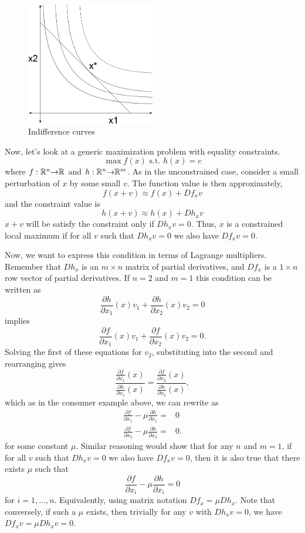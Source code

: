 \begin{figure}\caption{Indifference curves\label{fig:indiff}}
  \begin{center}
    \includegraphics[width=0.5\textwidth]{indiff}
  \end{center}
\end{figure}

Now, let's look at a generic maximization problem with equality
constraints. \[ \max f(x) \text{ s.t. } h(x) = c \]
where $f: \mathbb{R}^n {\rightarrow} \mathbb{R}$ and $h: \mathbb{R}^n {\rightarrow} \mathbb{R}^m$. As in the unconstrained
case, consider a small perturbation of $x$ by some small $v$. The
function value is then approximately,
\[ f(x+v) \approx f(x) + Df_x v \]
and the constraint value is 
\[ h(x+v) \approx h(x) + Dh_x v \] $x+v$ will be satisfy the
constraint only if $Dh_xv = 0$. Thus, $x$ is a constrained local
maximum if for all $v$ such that $Dh_x v = 0$ we also have $Df_x v =
0$. 

Now, we want to express this condition in terms of Lagrange
multipliers. Remember that $Dh_x$ is an $m \times n$ matrix of partial
derivatives, and $Df_x$ is a $1 \times n$ row vector of partial
derivatives.  If $n=2$ and $m=1$ this condition can be written as
\[ \frac{\partial h}{\partial x_1} (x) v_1 + \frac{\partial
  h}{\partial x_2} (x) v_2 = 0 \]
implies
\[ \frac{\partial f}{\partial x_1} (x) v_1 + \frac{\partial
  f}{\partial x_2} (x) v_2 = 0. \]
Solving the first of these equations for $v_2$, substituting into the
second and rearranging gives
\[ \frac{ \frac{\partial f}{\partial x_1}(x) } { \frac{\partial
    h}{\partial x_1}(x) } = \frac{ \frac{\partial f}{\partial x_2}(x)}
{ \frac{\partial h}{\partial x_2}(x) }, \]
which as in the consumer example above, we can rewrite as
\begin{align*}
  \frac{\partial f}{\partial x_1} - \mu  \frac{\partial h}{\partial x_1} = & 0 \\
  \frac{\partial f}{\partial x_2} - \mu  \frac{\partial h}{\partial x_2} = & 0.
\end{align*}
for some constant $\mu$. Similar reasoning would show that for any $n$
and $m=1$, if for all $v$ such that $Dh_x v = 0$ we also have $Df_x v =
0$, then it is also true that there exists $\mu$ such that 
\[ \frac{\partial f}{\partial x_i} - \mu  \frac{\partial h}{\partial
  x_i} = 0 \] 
for  $i=1, ..., n$. Equivalently, using matrix notation $Df_x = \mu
Dh_x$. Note that conversely, if such a $\mu$ exists, then trivially
for any $v$ with $Dh_x v =0$, we have $Df_x v = \mu Dh_x v = 0$. 

